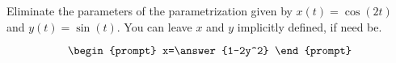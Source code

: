 \documentclass{ximera}
\author{Gregory Hartman \and Matthew Carr}
\begin{document}
\begin{exercise}





Eliminate the parameters of the parametrization given by $x(t)=\cos(2t)$ and $y(t)=\sin(t)$. You can leave $x$ and $y$ implicitly defined, if need be.

\[
\begin{prompt}
x=\answer{1-2y^2}
\end{prompt}
\]

\end{exercise}
\end{document}
